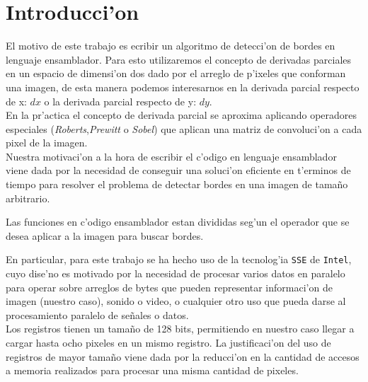 \documentclass[11pt]{article}
\begin{document}
\section{Introducci'on}
El motivo de este trabajo es ecribir un algoritmo de detecci'on de bordes en lenguaje ensamblador.  Para esto utilizaremos el concepto de derivadas parciales en un espacio de dimensi'on dos dado por el arreglo de p'ixeles que conforman una imagen, de esta manera podemos interesarnos en la derivada parcial respecto de x: $dx$ o la derivada parcial respecto de y: $dy$.\\
En la pr'actica el concepto de derivada parcial se aproxima aplicando operadores especiales (\emph{Roberts},\emph{Prewitt} o \emph{Sobel}) que aplican una matriz de convoluci'on a cada pixel de la imagen.\\
Nuestra motivaci'on a la hora de escribir el c'odigo en lenguaje ensamblador viene dada por la necesidad de conseguir una soluci'on eficiente en t'erminos de tiempo para resolver el problema de detectar bordes en una imagen de tama\~{n}o arbitrario. \\
\begin{center}
\begin{minipage}{11cm}
 Las funciones en c'odigo ensamblador estan divididas seg'un el operador que se desea aplicar a la imagen para buscar bordes.
\end{minipage}
\end{center}
En particular, para este trabajo se ha hecho uso de la tecnolog'ia \verb'SSE' de \verb'Intel', cuyo dise'no es motivado por la necesidad de procesar varios datos en paralelo para operar sobre arreglos de bytes que pueden representar informaci'on de imagen (nuestro caso), sonido o video, o cualquier otro uso que pueda darse al procesamiento paralelo de se\~{n}ales o datos.\\
Los registros tienen un tama\~{n}o de 128 bits, permitiendo en nuestro caso llegar a cargar hasta ocho pixeles en un mismo registro.  La justificaci'on del uso de registros de mayor tama\~{n}o viene dada por la reducci'on en la cantidad de accesos a memoria realizados para procesar una misma cantidad de pixeles.
\end{document}
